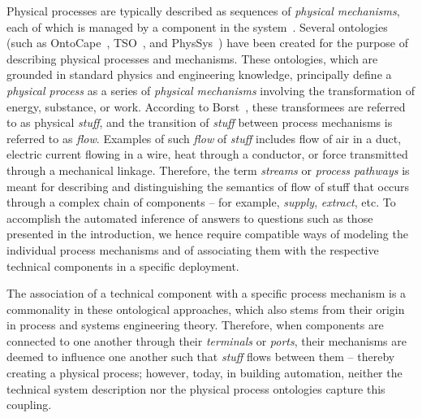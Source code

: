 \documentclass[sigconf]{acmart}
\begin{document}
Physical processes are typically described as sequences of \textit{physical mechanisms}, each of which is managed by a component in the system~\cite{pp_borst1995physsys,sd_akkermans1996ontology}.
%
Several ontologies (such as OntoCape~\cite{morbach2009ontocape}, TSO~\cite{sd_pauen2021tubes}, and PhysSys~\cite{borst1995physsys}) have been created for the purpose of describing physical processes and mechanisms.
These ontologies, which are grounded in standard physics and engineering knowledge, principally define a \textit{physical process} as a series of \textit{physical mechanisms} involving the transformation of energy, substance, or work.
According to Borst~\cite{borst1995physsys, sd_borst1997engineering}, these transformees are referred to as physical \textit{stuff}, and the transition of \textit{stuff} between process mechanisms is referred to as \textit{flow}.
Examples of such \textit{flow} of \textit{stuff} includes flow of air in a duct, electric current flowing in a wire, heat through a conductor, or force transmitted through a mechanical linkage.
Therefore, the term \textit{streams} or \textit{process pathways} is meant for describing and distinguishing the semantics of flow of stuff that occurs through a complex chain of components -- for example, \textit{supply}, \textit{extract}, etc.
%
To accomplish the automated inference of answers to questions such as those presented in the introduction, we hence require compatible ways of modeling the individual process mechanisms and of associating them with the respective technical components in a specific deployment.

The association of a technical component with a specific process mechanism is a commonality in these ontological approaches, which also stems from their origin in process and systems engineering theory.
Therefore, when components are connected to one another through their \textit{terminals} or \textit{ports}, their mechanisms are deemed to influence one another such that \textit{stuff} flows between them -- thereby creating a physical process; however, today, in building automation, neither the technical system description nor the physical process ontologies capture this coupling. 
\end{document}
